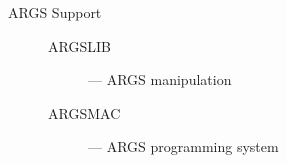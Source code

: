 \begin{description}
\item [ARGS Support] \mbox{}
\begin{description}
\item [ARGSLIB] --- ARGS manipulation
\item [ARGSMAC] --- ARGS programming system
\end{description}
\end{description}

\newpage




